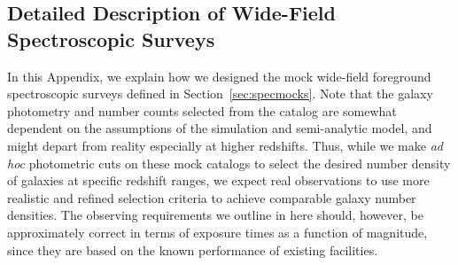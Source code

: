 \documentclass[twocolumn]{aastex63}
\begin{document}
\begin{CJK*}{UTF8}{gbsn}
\appendix

\section{Detailed Description of Wide-Field Spectroscopic Surveys}
\label{app:specmocks}

In this Appendix, we explain how we designed the mock wide-field foreground spectroscopic surveys defined in Section~\ref{sec:specmocks}. Note that the galaxy photometry and number counts selected from the \citet{henriques:2015} catalog are somewhat 
 dependent on the assumptions of the simulation and semi-analytic model, and might depart from reality especially
 at higher redshifts. Thus, while we make \textit{ad hoc} photometric cuts on these mock catalogs to select the desired number density of galaxies 
 at specific redshift ranges, we expect real observations to use more realistic and refined selection criteria to achieve comparable galaxy
 number densities. The observing requirements we outline in here should, however, be approximately correct in terms of exposure times as a function of magnitude, 
 since they are based on the known performance of existing facilities.


\end{CJK*}
\end{document}
